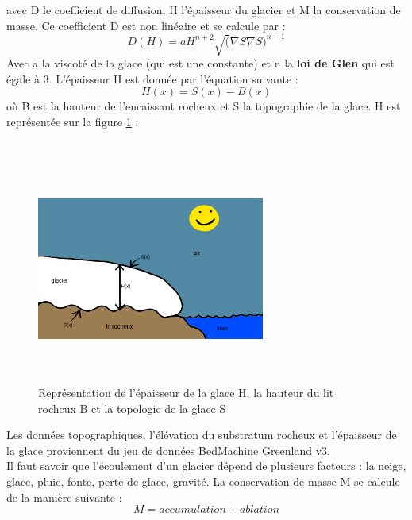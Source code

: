 \documentclass{article}
\begin{document}
avec D le coefficient de diffusion, H l'épaisseur du glacier et M la conservation de masse. 
\newline
Ce coefficient D est non linéaire et se calcule par :
\begin{equation}
D(H) = aH^{n+2}\sqrt(\nabla S\nabla S)^{n-1}
\label{eq5}
\end{equation}
Avec a la viscoté de la glace (qui est une constante) et n la \textbf{loi de Glen} qui est égale à 3.
\newline
L'épaisseur H est donnée par l'équation suivante :
\begin{equation}
H(x) = S(x) - B(x)
\label{eq6}
\end{equation}
où B est la hauteur de l'encaissant rocheux et S la topographie de la glace. H est représentée sur la figure \ref{fig01} : 
\\
\\
\begin{figure}[!htpb]
\centering
\includegraphics[width=7.5cm, keepaspectratio=true, height=7.5cm]{H.png}
\caption{Représentation de l'épaisseur de la glace H, la hauteur du lit rocheux B et la topologie de la glace S}
\label{fig01}
\end{figure}
\newline

Les données topographiques, l'élévation du substratum rocheux et l'épaisseur de la glace proviennent du jeu de données BedMachine Greenland v3. 
\\

Il faut savoir que l'écoulement d'un glacier dépend de plusieurs facteurs : la neige, glace, pluie, fonte, perte de glace, gravité. La conservation de masse M se calcule de la manière suivante :
\begin{equation}
M = accumulation + ablation
\label{5}
\end{equation}
\end{document}
